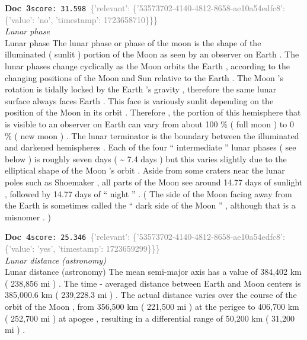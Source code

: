 \documentclass[a4paper,11pt]{article}
\begin{document}
\begin{docenv}
{\footnotesize\textcolor{doccolor}{\textbf{Doc~3}}}\hfill{\tiny\texttt{score:~31.598}}\ {\tiny\textcolor{gray}{\{'relevant': \{'53573702-4140-4812-8658-ae10a54edfc8': \{'value': 'no', 'timestamp': 1723658710\}\}\}}}\\[3pt]
{\small\textit{Lunar phase}}\\[2pt]
\vspace{2pt}
{\footnotesize Lunar phase
The lunar phase or phase of the moon is the shape of the illuminated ( sunlit ) portion of the Moon as seen by an observer on Earth . The lunar phases change cyclically as the Moon orbits the Earth , according to the changing positions of the Moon and Sun relative to the Earth . The Moon 's rotation is tidally locked by the Earth 's gravity , therefore the same lunar surface always faces Earth . This face is variously sunlit depending on the position of the Moon in its orbit . Therefore , the portion of this hemisphere that is visible to an observer on Earth can vary from about 100 \% ( full moon ) to 0 \% ( new moon ) . The lunar terminator is the boundary between the illuminated and darkened hemispheres . Each of the four `` intermediate '' lunar phases ( see below ) is roughly seven days ( \textasciitilde{} 7.4 days ) but this varies slightly due to the elliptical shape of the Moon 's orbit . Aside from some craters near the lunar poles such as Shoemaker , all parts of the Moon see around 14.77 days of sunlight , followed by 14.77 days of `` night '' . ( The side of the Moon facing away from the Earth is sometimes called the `` dark side of the Moon '' , although that is a misnomer . )}
\end{docenv}
\begin{docenv}
{\footnotesize\textcolor{doccolor}{\textbf{Doc~4}}}\hfill{\tiny\texttt{score:~25.346}}\ {\tiny\textcolor{gray}{\{'relevant': \{'53573702-4140-4812-8658-ae10a54edfc8': \{'value': 'yes', 'timestamp': 1723659299\}\}\}}}\\[3pt]
{\small\textit{Lunar distance (astronomy)}}\\[2pt]
\vspace{2pt}
{\footnotesize Lunar distance (astronomy)
The mean semi-major axis has a value of 384,402 km ( 238,856 mi ) . The time - averaged distance between Earth and Moon centers is 385,000.6 km ( 239,228.3 mi ) . The actual distance varies over the course of the orbit of the Moon , from 356,500 km ( 221,500 mi ) at the perigee to 406,700 km ( 252,700 mi ) at apogee , resulting in a differential range of 50,200 km ( 31,200 mi ) .}
\end{docenv}
\end{document}
